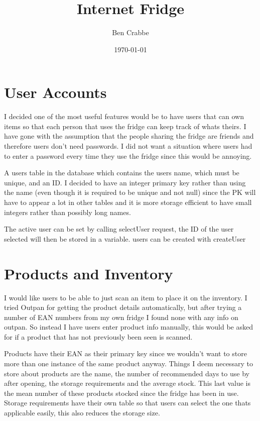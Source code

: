 \documentclass[]{article}
\begin{document}
\title{Internet Fridge}
\author{Ben Crabbe}
\date{\today}
\maketitle

\section{User Accounts}


I decided one of the most useful features would be to have users that can own items so that each person that uses the fridge can keep track of whats theirs. 
 I have gone with the assumption that the people sharing the fridge are friends and therefore users don't need passwords. I did not want a situation where users had to enter a password every time they use the fridge since this would be annoying.

A users table in the database which contains the users name, which must be unique, and an ID. I decided to have an integer primary key rather than using the name (even though it is required to be unique and not null) since the PK will have to appear a lot in other tables and it is more storage efficient to have small integers rather than possibly long names.

The active user can be set by calling selectUser request, the ID of the user selected will then be stored in a variable. users can be created with createUser


\section{Products and Inventory}

I would like users to be able to just scan an item to place it on the inventory. I tried Outpan for getting the product details automatically, but after trying a number of EAN numbers from my own fridge I found none with any info on outpan. So instead I have users enter product info manually, this would be asked for if a product that has not previously been seen is scanned. 

Products have their EAN as their primary key since we wouldn't want to store more than one instance of the same product anyway. Things I deem necessary to store about products are the name, the number of recommended days to use by after opening, the storage requirements and the average stock. This last value is the mean number of these products stocked since the fridge has been in use. Storage requirements have their own table so that users can select the one thats applicable easily, this also reduces the storage size.
\end{document}
